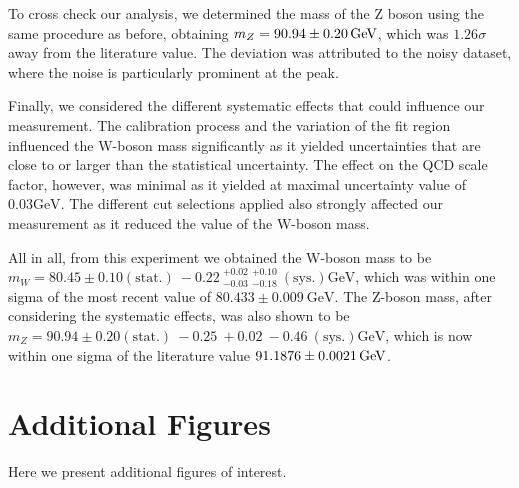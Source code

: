 \documentclass[a4paper]{report}
\numberwithin{equation}{section}
\begin{document}
To cross check our analysis, we determined the mass of the Z boson using the same procedure as before, obtaining 
$m_Z = \SI{90.94 \pm 0.20}{\giga\electronvolt}$, which was $1.26\sigma$ away from the literature value. The deviation was attributed 
to the noisy dataset, where the noise is particularly prominent at the peak. \par 

Finally, we considered the different systematic effects that could influence our measurement. The calibration process and the 
variation of the fit region influenced the W-boson mass significantly as it yielded uncertainties that are close to or larger 
than the statistical uncertainty. The effect on the QCD scale factor, however, was minimal as it yielded at maximal 
uncertainty value of $0.03 \si{\giga\electronvolt}$. The different cut selections applied also strongly affected our measurement 
as it reduced the value of the W-boson mass. \par 

All in all, from this experiment we obtained the W-boson mass to be $m_W = 80.45 \pm 0.10 (\mathrm{stat.}) \: -0.22 \: 
^{+0.02}_{-0.03} \: ^{+0.10}_{-0.18} \: (\mathrm{sys.}) \si{\giga\electronvolt}$, which was within one sigma of the most recent 
value of  $80.433 \pm 0.009 \ \text{GeV}$. The Z-boson mass, after considering the systematic effects, was also shown to be $m_Z = 90.94 \pm 0.20 (\mathrm{stat.}) \: 
-0.25 \: + 0.02 \: -0.46 \: (\mathrm{sys.}) \si{\giga\electronvolt}$, which is now within one sigma of the literature value 
$\SI{91.1876 \pm 0.0021}{\giga\electronvolt}$. 

\printbibliography

\appendix

\chapter{Additional Figures} \label{chap:appendix_figs}

Here we present additional figures of interest.
\end{document}
